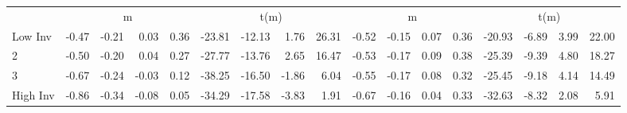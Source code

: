 \begin{table}[!ht]
\begin{tabular}{lrrrrrrrrrrrrrrrr}
  
    
      & \multicolumn{4}{c}{m} & \multicolumn{4}{c}{t(m)}
    
      & \multicolumn{4}{c}{m} & \multicolumn{4}{c}{t(m)}
    
    \\
      \cmidrule(r){2-5} \cmidrule(r){6-9} \cmidrule(r){10-13} \cmidrule(r){14-17}

    Low Inv   & -0.47  & -0.21  & 0.03  & 0.36  & -23.81  & -12.13  & 1.76  & 26.31  & -0.52  & -0.15  & 0.07  & 0.36  & -20.93  & -6.89  & 3.99  & 22.00  \\
           2  & -0.50  & -0.20  & 0.04  & 0.27  & -27.77  & -13.76  & 2.65  & 16.47  & -0.53  & -0.17  & 0.09  & 0.38  & -25.39  & -9.39  & 4.80  & 18.27  \\
           3  & -0.67  & -0.24  & -0.03  & 0.12  & -38.25  & -16.50  & -1.86  & 6.04  & -0.55  & -0.17  & 0.08  & 0.32  & -25.45  & -9.18  & 4.14  & 14.49  \\
    High Inv  & -0.86  & -0.34  & -0.08  & 0.05  & -34.29  & -17.58  & -3.83  & 1.91  & -0.67  & -0.16  & 0.04  & 0.33  & -32.63  & -8.32  & 2.08  & 5.91  \\

  

  \bottomrule
\end{tabular}
\label{tbl:32_Size_BMm_Prior_C97}
\end{table}